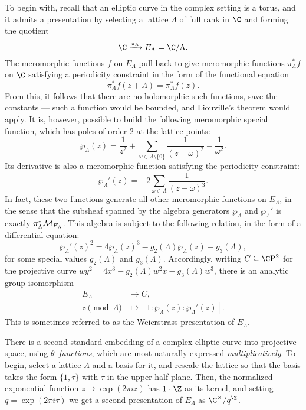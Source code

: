 To begin with, recall that an elliptic curve in the complex setting is a torus, and it admits a presentation by selecting a lattice $\Lambda$ of full rank in $\C$ and forming the quotient \[\C \xrightarrow{\pi_\Lambda} E_\Lambda = \C / \Lambda.\]  The meromorphic functions $f$ on $E_\Lambda$ pull back to give meromorphic functions $\pi_\Lambda^* f$ on $\C$ satisfying a periodicity constraint in the form of the functional equation \[\pi_\Lambda^* f(z + \Lambda) = \pi_\Lambda^* f(z).\]  From this, it follows that there are no holomorphic such functions, save the constants --- such a function would be bounded, and Liouville's theorem would apply.  It is, however, possible to build the following meromorphic special function, which has poles of order $2$ at the lattice points: \[\wp_\Lambda(z) = \frac{1}{z^2} + \sum_{\omega \in \Lambda \setminus \{0\}} \frac{1}{(z - \omega)^2} - \frac{1}{\omega^2}.\]  Its derivative is also a meromorphic function satisfying the periodicity constraint: \[\wp_\Lambda'(z) = -2 \sum_{\omega \in \Lambda} \frac{1}{(z - \omega)^3}.\]  In fact, these two functions generate all other meromorphic functions on $E_\Lambda$, in the sense that the subsheaf spanned by the algebra generators $\wp_\Lambda$ and $\wp_\Lambda'$ is exactly $\pi_\Lambda^* \mathcal{M}_{E_\Lambda}$.  This algebra is subject to the following relation, in the form of a differential equation: \[\wp_\Lambda'(z)^2 = 4 \wp_\Lambda(z)^3 - g_2(\Lambda) \wp_\Lambda(z) - g_3(\Lambda),\] for some special values $g_2(\Lambda)$ and $g_3(\Lambda)$.  Accordingly, writing $C \subseteq \CP^2$ for the projective curve $wy^2 = 4x^3 - g_2(\Lambda) w^2 x - g_3(\Lambda) w^3$, there is an analytic group isomorphism
\begin{align*}
E_\Lambda & \to C, \\
z \pmod \Lambda & \mapsto [1: \wp_\Lambda(z): \wp_\Lambda'(z)].
\end{align*}
This is sometimes referred to as the Weierstrass presentation of $E_\Lambda$.

There is a second standard embedding of a complex elliptic curve into projective space, using \textit{$\theta$--functions}, which are most naturally expressed \emph{multiplicatively}.  To begin, select a lattice $\Lambda$ and a basis for it, and rescale the lattice so that the basis takes the form $\{1, \tau\}$ with $\tau$ in the upper half-plane.  Then, the normalized exponential function $z \mapsto \exp(2 \pi i z)$ has $1 \cdot \Z$ as its kernel, and setting $q = \exp(2 \pi i \tau)$ we get a second presentation of $E_\Lambda$ as $\C^\times / q^{\Z}$.

